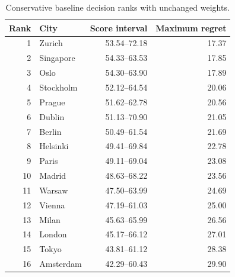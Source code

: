 \begin{table}[htbp]\centering
\caption{Conservative baseline decision ranks with unchanged weights.}\label{tab:baseline}
\begin{tabular}{rlrr}
\toprule Rank & City & Score interval & Maximum regret\\\midrule
1 & Zurich & 53.54--72.18 & 17.37 \\
2 & Singapore & 54.33--63.53 & 17.85 \\
3 & Oslo & 54.30--63.90 & 17.89 \\
4 & Stockholm & 52.12--64.54 & 20.06 \\
5 & Prague & 51.62--62.78 & 20.56 \\
6 & Dublin & 51.13--70.90 & 21.05 \\
7 & Berlin & 50.49--61.54 & 21.69 \\
8 & Helsinki & 49.41--69.84 & 22.78 \\
9 & Paris & 49.11--69.04 & 23.08 \\
10 & Madrid & 48.63--68.22 & 23.56 \\
11 & Warsaw & 47.50--63.99 & 24.69 \\
12 & Vienna & 47.19--61.03 & 25.00 \\
13 & Milan & 45.63--65.99 & 26.56 \\
14 & London & 45.17--66.12 & 27.01 \\
15 & Tokyo & 43.81--61.12 & 28.38 \\
16 & Amsterdam & 42.29--60.43 & 29.90 \\
\bottomrule
\end{tabular}
\end{table}
